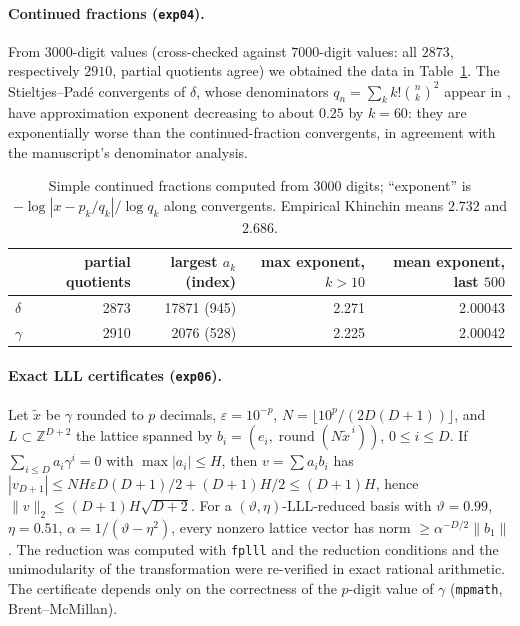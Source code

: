 \documentclass[11pt,a4paper]{article}
\newcommand{\Z}{\mathbb Z}
\theoremstyle{definition}
\theoremstyle{remark}
\numberwithin{equation}{section}
\begin{document}
\paragraph{Continued fractions (\texttt{exp04}).} From $3000$-digit values (cross-checked
against $7000$-digit values: all $2873$, respectively $2910$, partial quotients agree) we
obtained the data in Table~\ref{I:tab:cf}. The Stieltjes--Pad\'e convergents of $\delta$,
whose denominators $q_n=\sum_kk!\binom nk^2$ appear in \cite{K001}, have approximation
exponent decreasing to about $0.25$ by $k=60$: they are exponentially worse than the
continued-fraction convergents, in agreement with the manuscript's denominator analysis.

\begin{table}[h]\centering\small
\begin{tabular}{@{}lrrrr@{}}
\toprule
 & partial quotients & largest $a_k$ (index) & max exponent, $k>10$ & mean exponent, last $500$\\
\midrule
$\delta$ & 2873 & 17871 (945) & 2.271 & 2.00043\\
$\gamma$ & 2910 & 2076 (528) & 2.225 & 2.00042\\
\bottomrule
\end{tabular}
\caption{Simple continued fractions computed from $3000$ digits; ``exponent'' is
$-\log|x-p_k/q_k|/\log q_k$ along convergents. Empirical Khinchin means $2.732$ and
$2.686$.}
\label{I:tab:cf}
\end{table}

\paragraph{Exact LLL certificates (\texttt{exp06}).}
Let $\tilde x$ be $\gamma$ rounded to $p$ decimals, $\varepsilon=10^{-p}$,
$N=\lfloor10^p/(2D(D+1))\rfloor$, and $L\subset\Z^{D+2}$ the lattice spanned by
$b_i=(e_i,\operatorname{round}(N\tilde x^{\,i}))$, $0\le i\le D$. If
$\sum_{i\le D}a_i\gamma^i=0$ with $\max|a_i|\le H$, then $v=\sum a_ib_i$ has
$|v_{D+1}|\le NH\varepsilon D(D+1)/2+(D+1)H/2\le(D+1)H$, hence
$\|v\|_2\le(D+1)H\sqrt{D+2}$. For a $(\vartheta,\eta)$-LLL-reduced basis with
$\vartheta=0.99$, $\eta=0.51$, $\alpha=1/(\vartheta-\eta^2)$, every nonzero lattice vector
has norm $\ge\alpha^{-D/2}\|b_1\|$. The reduction was computed with \texttt{fplll} and the
reduction conditions and the unimodularity of the transformation were re-verified in
exact rational arithmetic. The certificate depends only on the correctness of the
$p$-digit value of $\gamma$ (\texttt{mpmath}, Brent--McMillan).
\end{document}
